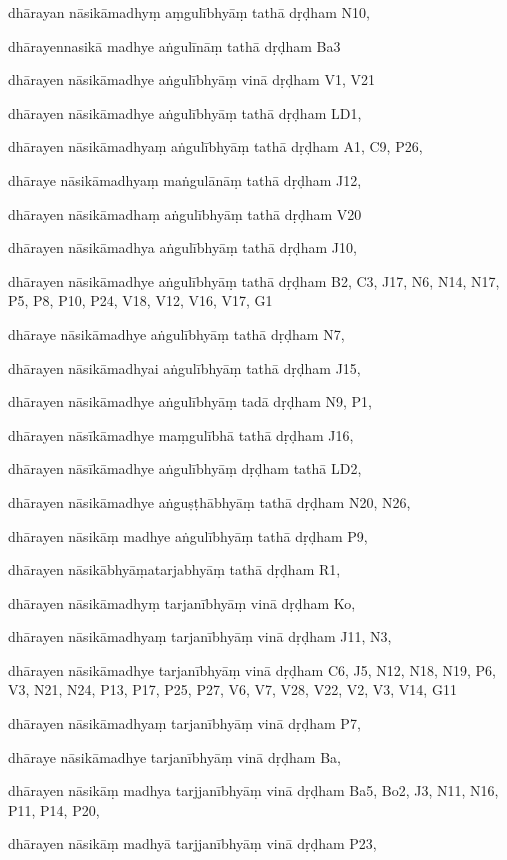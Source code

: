 \begin{ekdosis}
\begin{marma}[hp01_055]
\begin{marma}[hp02_009]
\begin{marma}[hp02_011]
\begin{marma}[hp02_65cd]
\item[dhārayan nāsikāmadhyṃ aṃgulībhyāṃ tathā dṛḍham] N10,
\item[dhārayennasikā madhye aṅgulīnāṃ tathā dṛḍham] Ba3
\item[dhārayen nāsikāmadhye aṅgulībhyāṃ vinā dṛḍham] V1, V21
\item[dhārayen nāsikāmadhye aṅgulībhyāṃ tathā dṛḍham] LD1,
\item[dhārayen nāsikāmadhyaṃ aṅgulībhyāṃ tathā dṛḍham] A1, C9, P26, 
\item[dhāraye nāsikāmadhyaṃ maṅgulānāṃ tathā dṛḍham] J12,
\item[dhārayen nāsikāmadhaṃ aṅgulībhyāṃ tathā dṛḍham] V20
\item[dhārayen nāsikāmadhya aṅgulībhyāṃ tathā dṛḍham] J10,
\item[dhārayen nāsikāmadhye aṅgulībhyāṃ tathā dṛḍham] B2, C3, J17, N6, N14, N17, P5, P8, P10, P24, V18, V12, V16, V17, G1
\item[dhāraye nāsikāmadhye aṅgulībhyāṃ tathā dṛḍham] N7, 
\item[dhārayen nāsikāmadhyai aṅgulībhyāṃ tathā dṛḍham] J15,
\item[dhārayen nāsikāmadhye aṅgulībhyāṃ tadā dṛḍham] N9, P1, 
\item[dhārayen nāsīkāmadhye maṃgulībhā tathā dṛḍham] J16,
\item[dhārayen nāsīkāmadhye aṅgulībhyāṃ dṛḍham tathā] LD2,
\item[dhārayen nāsikāmadhye aṅguṣṭhābhyāṃ tathā dṛḍham] N20, N26,
\item[dhārayen nāsikāṃ madhye aṅgulībhyāṃ tathā dṛḍham] P9, 
\item[dhārayen nāsikābhyāṃatarjabhyāṃ tathā dṛḍham] R1,
\item[dhārayen nāsikāmadhyṃ tarjanībhyāṃ vinā dṛḍham] Ko,
\item[dhārayen nāsikāmadhyaṃ tarjanībhyāṃ vinā dṛḍham] J11, N3, 
\item[dhārayen nāsikāmadhye tarjanībhyāṃ vinā dṛḍham] C6, J5, N12, N18, N19, P6, V3, N21, N24, P13, P17, P25, P27, V6, V7, V28, V22, V2, V3, V14, G11
\item[dhārayen nāsikāmadhyaṃ tarjanībhyāṃ vinā dṛḍham] P7,
\item[dhāraye nāsikāmadhye tarjanībhyāṃ vinā dṛḍham] Ba,
\item[dhārayen nāsikāṃ madhya tarjjanībhyāṃ vinā dṛḍham] Ba5, Bo2, J3, N11, N16, P11, P14, P20, 
\item[dhārayen nāsikāṃ madhyā tarjjanībhyāṃ vinā dṛḍham] P23,

\end{marma}
\end{marma}
\end{marma}
\end{marma}
\end{ekdosis}
